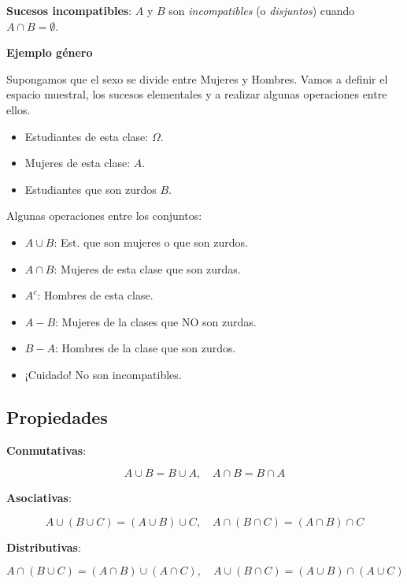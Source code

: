 \documentclass[]{book}
\providecommand{\tightlist}{%
  \setlength{\itemsep}{0pt}\setlength{\parskip}{0pt}}
\begin{document}
\textbf{Sucesos incompatibles}: \(A\) y \(B\) son \emph{incompatibles} (o \emph{disjuntos}) cuando \(A\cap B=\emptyset\).

\textbf{Ejemplo género}

Supongamos que el sexo se divide entre Mujeres y Hombres. Vamos a definir el espacio muestral, los sucesos elementales y a realizar algunas operaciones entre ellos.

\begin{itemize}
\tightlist
\item
  Estudiantes de esta clase: \(\Omega\).
\item
  Mujeres de esta clase: \(A\).
\item
  Estudiantes que son zurdos \(B\).
\end{itemize}

Algunas operaciones entre los conjuntos:

\begin{itemize}
\tightlist
\item
  \(A\cup B\): Est. que son mujeres o que son zurdos.
\item
  \(A\cap B\): Mujeres de esta clase que son zurdas.
\item
  \(A^c\): Hombres de esta clase.
\item
  \(A-B\): Mujeres de la clases que NO son zurdas.
\item
  \(B-A\): Hombres de la clase que son zurdos.
\item
  ¡Cuidado! No son incompatibles.
\end{itemize}

\hypertarget{propiedades}{%
\subsection{Propiedades}\label{propiedades}}

\textbf{Conmutativas}:

\[A\cup B=B\cup A, \quad A\cap B=B\cap A\]

\textbf{Asociativas}:

\[A\cup(B\cup C)=(A\cup B)\cup C, \quad A\cap(B\cap C)=(A\cap B)\cap C\]

\textbf{Distributivas}:

\[A\cap(B\cup C)=(A\cap B)\cup (A\cap C), \quad A\cup(B\cap C)=(A\cup B)\cap (A\cup C)\]
\end{document}
